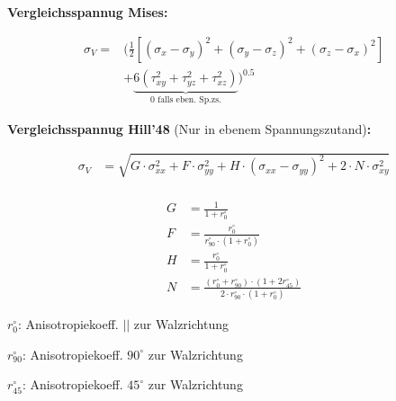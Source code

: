 \textbf{Vergleichsspannug Mises: }\\
\begin{tiny}
    \begin{center}
        
    \[
    \boxed{      
        \begin{aligned}
            \sigma_V =& (\frac{1}{2}[(\sigma_x - \sigma_y)^2 + (\sigma_y - \sigma_z)^2 + (\sigma_z - \sigma_x)^2]\\
            &+\underbrace{6(\tau_{xy}^2 + \tau_{yz}^2 +\tau_{xz}^2)}_{\text{0 falls eben. Sp.zs.}})^{0.5}
        \end{aligned}
    }
    \]
\end{center}
\end{tiny}
\vspace{1mm}

\textbf{Vergleichsspannug Hill'48} (Nur in ebenem Spannungszutand)\textbf{: }\\
\begin{tiny}
    \[
    \boxed{      
        \begin{aligned}
            \sigma_V &= \sqrt{G \cdot \sigma_{xx}^2 + F \cdot \sigma_{yy}^2 + H \cdot (\sigma_{xx} - \sigma_{yy})^2 + 2 \cdot N \cdot \sigma_{xy}^2}\\
                    \end{aligned}
    }
    \]
\end{tiny}
\begin{minipage}{0.5\linewidth}
    \begin{tiny}
        \[
        \boxed{      
            \begin{aligned}
                G &= \frac{1}{1 + r_0^\circ}\\
                F &= \frac{r_0^\circ}{r_{90}^\circ \cdot (1 + r_0^\circ)}\\
                H &= \frac{r_0^\circ}{1 + r_0^\circ}\\
                N &= \frac{(r_0^\circ +r_{90}^\circ)\cdot(1+2r_{45}^\circ)}{2\cdot r_{90}^\circ\cdot(1+r_0^\circ)}
            \end{aligned}
        }
        \]
    \end{tiny}
\end{minipage}
\begin{minipage}{0.5\linewidth}
    \item $r_0^\circ$: Anisotropiekoeff. $||$ zur Walzrichtung
    \item $r_{90}^\circ$: Anisotropiekoeff. $90^\circ$ zur Walzrichtung
    \item $r_{45}^\circ$: Anisotropiekoeff. $45^\circ$ zur Walzrichtung
\end{minipage}
\vspace{1mm}

